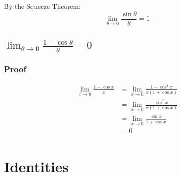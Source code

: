 \documentclass[letterpaper, landscape]{exam}
\begin{document}
  By the Squeeze Theorem:
  \[
    \lim_{\theta \to 0} \frac{\sin \theta}{\theta} = 1
  \]

  \subsection{$\lim_{\theta \to 0} \frac{1 - \cos \theta}{\theta} = 0$} %

  \subsubsection{Proof} %
  
  \begin{align*}
    \lim_{x \to 0} \frac{1 - \cos x}{x} 
      & = \lim_{x \to 0} \frac{1 - \cos^2 x}{x(1 + \cos x)} \\
      & = \lim_{x \to 0} \frac{\sin^2 x}{x(1 + \cos x)} \\
      & = \lim_{x \to 0} \frac{\sin x}{1 + \cos x} \\
      & = 0 \\
  \end{align*}

  

  \section{Identities} %
  
\end{document}
